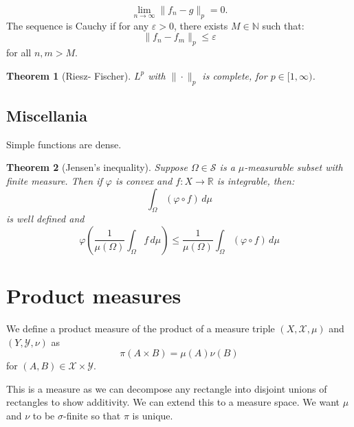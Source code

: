 \documentclass{article}
\newtheorem{theorem}{Theorem}
\theoremstyle{definition}
\numberwithin{theorem}{section}
\numberwithin{equation}{section}
\begin{document}
\begin{equation}
	\lim_{n \rightarrow \infty} \| f_n - g \|_p = 0.
\end{equation}
The sequence is Cauchy if for any $\varepsilon > 0$, there exists $M \in \mathbb{N}$ such that:
\begin{equation}
	\|f_n - f_m \|_{p} \leq \varepsilon
\end{equation}
for all $n, m  > M$. 

\begin{theorem}[Riesz- Fischer]
	$L^p$ with $\| \cdot \|_{p}$ is complete, for $p \in [1, \infty)$. 
\end{theorem}
\subsection{Miscellania}
Simple functions are dense.

\begin{theorem}[Jensen's inequality]
	Suppose $\Omega \in \mathcal{S}$ is a $\mu$-measurable subset with finite measure. Then if $\varphi$ is convex and $f : X \rightarrow \mathbb{R}$ is integrable, then:
\begin{equation}
	\int_{\Omega} (\varphi \circ f) \, d\mu 
\end{equation}
is well defined
and
\begin{equation}
	\varphi \left(\frac{1}{\mu(\Omega)} \int_{\Omega} f \, d\mu \right)\leq \frac{1}{\mu(\Omega)}\int_{\Omega} (\varphi \circ f) \, d\mu 
\end{equation}
\end{theorem}

\section{Product measures}
We define a product measure of the product of a measure triple $(X, \mathcal{X}, \mu)$ and $(Y, \mathcal{Y}, \nu)$ as
\begin{equation}
	\pi(A \times B) = \mu(A) \nu(B)
\end{equation}
for $(A, B) \in \mathcal{X} \times \mathcal{Y}$. 

This is a measure as we can decompose any rectangle into disjoint unions of rectangles to show additivity. We can extend this to a measure space. We want $\mu$ and $\nu$ to be $\sigma$-finite so that $\pi$ is unique. 
\end{document}
